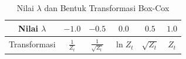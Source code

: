 \begin{table}[h]
    \centering
    \caption{Nilai $\lambda$ dan Bentuk Transformasi Box-Cox}
    \label{tab:boxcox}
    \begin{tabular}{|c|c|c|c|c|c|}
        \hline
        Nilai $\lambda$ & $-1.0$ & $-0.5$ & $0.0$ & $0.5$ & $1.0$ \\ \hline
        Transformasi & $\frac{1}{Z_t}$ & $\frac{1}{\sqrt{Z_t}}$ & $\ln Z_t$ & $\sqrt{Z_t}$ & $Z_t$ \\ \hline
    \end{tabular}
\end{table}